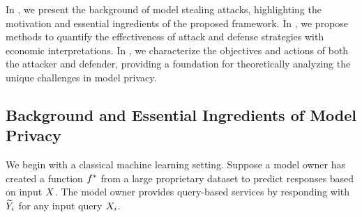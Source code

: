 \def\attstr{\textrm{AttStr}}
\def\atteff{\textrm{AttEff}}
\def\relatteff{\textrm{RelAttEff}}
\def\defstr{\textrm{DefStr}}
\def\defeff{\textrm{DefEff}}
\def\reldefeff{\textrm{RelDefEff}}
\def\utilloss{\textrm{UtilLoss}}
\def\eco{potent\xspace}


    In , we present the background of model stealing attacks, highlighting the motivation and essential ingredients of the proposed framework. 
    In , we propose methods to quantify the effectiveness of attack and defense strategies with economic interpretations.
    In , we characterize the objectives and actions of both the attacker and defender, providing a foundation for theoretically analyzing the unique challenges in model privacy.


    \subsection{Background and Essential Ingredients of Model Privacy} \label{subsec:overview}
    We begin with a classical machine learning setting. Suppose a model owner has created a function $f^*$ from a large proprietary dataset to predict responses based on input $X$. The model owner provides query-based services by responding with $\widetilde{Y}_i$ for any input query $X_i$. 
    
